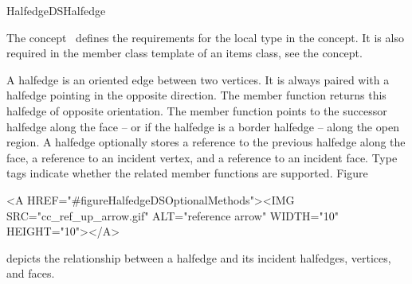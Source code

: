 
\ccRefPageBegin



\begin{ccRefConcept}{HalfedgeDSHalfedge}
\label{pageHalfedgeDSItemsHalfedgeRef}

\ccDefinition
  
The concept \ccRefName\ defines the requirements for the local  
type in the  concept. It is also required in 
the  member class template of an
items class, see the  concept.

A halfedge is an oriented edge between two vertices. It is always
paired with a halfedge pointing in the opposite direction. The
 member function returns this halfedge of opposite
orientation. The  member function points to the successor
halfedge along the face -- or if the halfedge is a border halfedge --
along the open region. A halfedge optionally stores a reference to the
previous halfedge along the face, a reference to an incident vertex,
and a reference to an incident face. Type tags indicate whether the
related member functions are supported.
Figure~\ccTexHtml{\ref{figureHalfedgeDSOptionalMethods}}{}\begin{ccHtmlOnly}
  <A HREF="#figureHalfedgeDSOptionalMethods"><IMG 
  SRC="cc_ref_up_arrow.gif" ALT="reference arrow" WIDTH="10" HEIGHT="10"></A>
\end{ccHtmlOnly}
depicts the relationship between a halfedge and its incident
halfedges, vertices, and faces.


\end{ccRefConcept}
